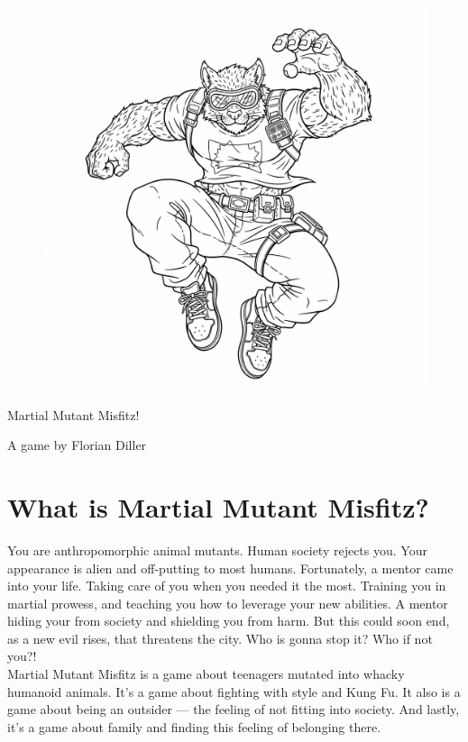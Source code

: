 \documentclass{book}
\begin{document}

\vspace*{\fill}

\begin{figure}[tph!]
\centering\includegraphics[width=12cm]{images/frontCover.png}
\end{figure}
\centering\Huge{}Martial Mutant Misfitz!
\normalfont\large

A game by Florian Diller

\raggedright
\chapter*{What is Martial Mutant Misfitz?}
\normalfont\large You are anthropomorphic animal mutants. Human society rejects you. Your appearance is alien and off-putting to most humans. Fortunately, a mentor came into your life. Taking care of you when you needed it the most. Training you in martial prowess, and teaching you how to leverage your new abilities. A mentor hiding your from society and shielding you from harm. But this could soon end, as a new evil rises, that threatens the city. Who is gonna stop it? Who if not you?!\\
\medskip
Martial Mutant Misfitz is a game about teenagers mutated into whacky humanoid animals. It's a game about fighting with style and Kung Fu. It also is a game about being an outsider --- the feeling of not fitting into society. And lastly, it's a game about family and finding this feeling of belonging there.
\end{document}
